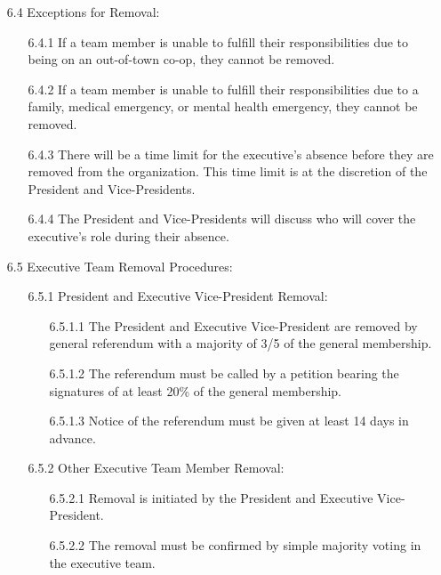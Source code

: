 \documentclass[12pt,a4paper]{article}
\begin{document}
\begin{enumerate}
\item[6.4] Exceptions for Removal:

\begin{enumerate}
\item[6.4.1] If a team member is unable to fulfill their responsibilities due to being on an out-of-town co-op, they cannot be removed.

\item[6.4.2] If a team member is unable to fulfill their responsibilities due to a family, medical emergency, or mental health emergency, they cannot be removed.

\item[6.4.3] There will be a time limit for the executive's absence before they are removed from the organization. This time limit is at the discretion of the President and Vice-Presidents.

\item[6.4.4] The President and Vice-Presidents will discuss who will cover the executive's role during their absence.
\end{enumerate}

\item[6.5] Executive Team Removal Procedures:

\begin{enumerate}
\item[6.5.1] President and Executive Vice-President Removal:

\begin{enumerate}
\item[6.5.1.1] The President and Executive Vice-President are removed by general referendum with a majority of 3/5 of the general membership.

\item[6.5.1.2] The referendum must be called by a petition bearing the signatures of at least 20\% of the general membership.

\item[6.5.1.3] Notice of the referendum must be given at least 14 days in advance.
\end{enumerate}

\item[6.5.2] Other Executive Team Member Removal:

\begin{enumerate}
\item[6.5.2.1] Removal is initiated by the President and Executive Vice-President.

\item[6.5.2.2] The removal must be confirmed by simple majority voting in the executive team.


\end{enumerate}
\end{enumerate}
\end{enumerate}
\end{document}
